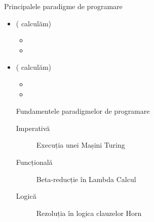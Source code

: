 \documentclass[xcolor=x11names,compress,10pt]{beamer}
\begin{document}
\begin{frame}{Principalele paradigme de programare}
\begin{itemize}
	\item {} ( calcul\u am)
	\vspace{.2cm}
	\begin{itemize}
	\item {}
		\vspace{.2cm}
	\item {}
	
	\end{itemize}
	
	\vspace{.5cm}
	\item  {} ( calcul\u am)
		\vspace{.2cm}
	\begin{itemize}
	
	\item {}
	\vspace{.2cm}
	\item {}

	\end{itemize}

	\begin{block}{Fundamentele paradigmelor de programare}
		\begin{description}
			\item[Imperativă] Execuția unei Mașini Turing
			\item[Funcțională] Beta-reducție în Lambda Calcul
			\item[Logică] Rezoluția în logica clauzelor Horn
		\end{description}
	\end{block}

\end{itemize}

\end{frame}

\end{document}
